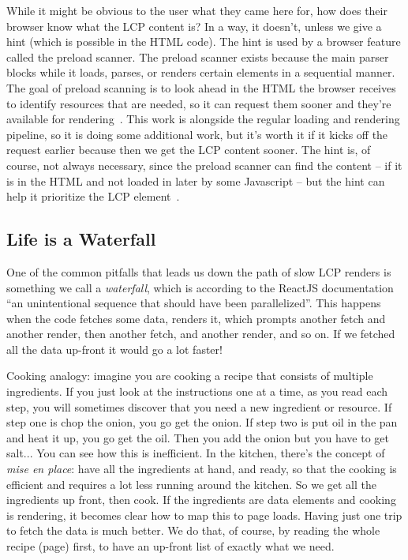 While it might be obvious to the user what they came here for, how does their browser know   what the LCP content is? In a way, it doesn't, unless we give a hint (which is possible in the HTML code). The hint is used by a browser feature called the preload scanner. The preload scanner exists because the main parser blocks while it loads, parses, or renders certain elements in a sequential manner. The goal of preload scanning is to look ahead in the HTML the browser receives to identify resources that are needed, so it can request them sooner and they're available for rendering~\cite{preloadscanner}. This work is alongside the regular loading and rendering pipeline, so it is doing some additional work, but it's worth it if it kicks off the request earlier because then we get the LCP content sooner. The hint is, of course, not always necessary, since the preload scanner can find the content -- if it is in the HTML and not loaded in later by some Javascript -- but the hint can help it prioritize the LCP element~\cite{lcp}.

\subsection*{Life is a Waterfall}

One of the common pitfalls that leads us down the path of slow LCP renders is something we call a \textit{waterfall}, which is according to the ReactJS documentation ``an unintentional sequence that should have been parallelized''. This happens when the code fetches some data, renders it, which prompts another fetch and another render, then another fetch, and another render, and so on. If we fetched all the data up-front it would go a lot faster! 

Cooking analogy: imagine you are cooking a recipe that consists of multiple ingredients. If you just look at the instructions one at a time, as you read each step, you will sometimes discover that you need a new ingredient or resource. If step one is chop the onion, you go get the onion. If step two is put oil in the pan and heat it up, you go get the oil. Then you add the onion but you have to get salt... You can see how this is inefficient. In the kitchen, there's the concept of \textit{mise en place}: have all the ingredients at hand, and ready, so that the cooking is efficient and requires a lot less running around the kitchen. So we get all the ingredients up front, then cook. If the ingredients are data elements and cooking is rendering, it becomes clear how to map this to page loads. Having just one trip to fetch the data is much better. We do that, of course, by reading the whole recipe (page) first, to have an up-front list of exactly what we need.

